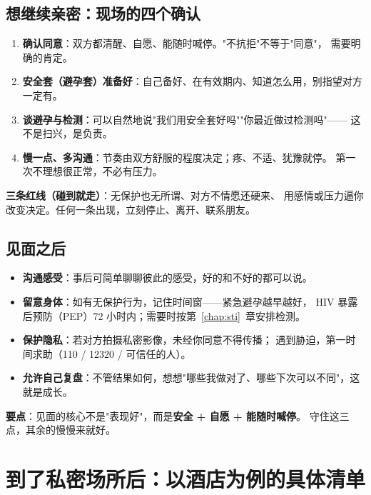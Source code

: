 \documentclass[12pt,UTF8,openany]{ctexbook}
\begin{document}
\section{想继续亲密：现场的四个确认}

\begin{enumerate}[leftmargin=2em,itemsep=0.3em]
  \item \textbf{确认同意}：双方都清醒、自愿、能随时喊停。"不抗拒"不等于"同意"，
        需要明确的肯定。
  \item \textbf{安全套（避孕套）准备好}：自己备好、在有效期内、知道怎么用，别指望对方一定有。
  \item \textbf{谈避孕与检测}：可以自然地说"我们用安全套好吗""你最近做过检测吗"——
        这不是扫兴，是负责。
  \item \textbf{慢一点、多沟通}：节奏由双方舒服的程度决定；疼、不适、犹豫就停。
        第一次不理想很正常，不必有压力。
\end{enumerate}

\noindent\textbf{三条红线（碰到就走）}：无保护也无所谓、对方不情愿还硬来、
用感情或压力逼你改变决定。任何一条出现，立刻停止、离开、联系朋友。

\section{见面之后}

\begin{itemize}[leftmargin=2em]
  \item \textbf{沟通感受}：事后可简单聊聊彼此的感受，好的和不好的都可以说。
  \item \textbf{留意身体}：如有无保护行为，记住时间窗——紧急避孕越早越好，
        HIV 暴露后预防（PEP）72 小时内；需要时按第~\ref{chap:sti}~章安排检测。
  \item \textbf{保护隐私}：若对方拍摄私密影像，未经你同意不得传播；
        遇到胁迫，第一时间求助（110 / 12320 / 可信任的人）。
  \item \textbf{允许自己复盘}：不管结果如何，想想"哪些我做对了、哪些下次可以不同"，这就是成长。
\end{itemize}

\noindent\textbf{要点}：见面的核心不是"表现好"，而是\textbf{安全 + 自愿 + 能随时喊停}。
守住这三点，其余的慢慢来就好。

\chapter{到了私密场所后：以酒店为例的具体清单}
\label{chap:private}
\end{document}
